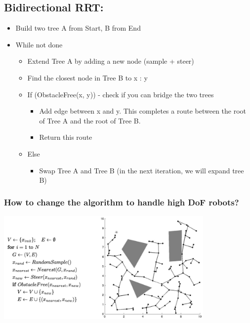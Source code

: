 \documentclass[10pt]{article}
\begin{document}
\subsection*{Bidirectional RRT:}
\begin{itemize}
	\item Build two tree A from Start, B from End
	\item While not done
	\begin{itemize}
        \item Extend Tree A by adding a new node (sample + steer)
        \item Find the closest node in Tree B to x : y
        \item If (ObstacleFree(x, y)) - check if you can bridge the two trees
        \begin{itemize}
            \item Add edge between x and y.  This completes a route between the root of Tree A and the root of Tree B.  
            \item Return this route
        \end{itemize}
        \item Else
        \begin{itemize}
            \item Swap Tree A and Tree B (in the next iteration, we will expand tree B)
        \end{itemize}
    \end{itemize}
\end{itemize}

\subsubsection*{How to change the algorithm to handle high DoF robots?}
\begin{center} 
    \includegraphics*[width=0.8\textwidth]{L1_16.png} 
\end{center}
\end{document}
